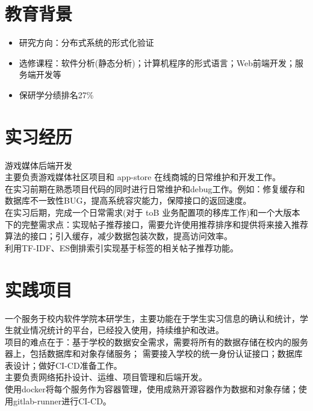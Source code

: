 \documentclass{resume}
\begin{document}

\sepspace
{}

\section{教育背景}
\begin{itemize}
    \item 研究方向：分布式系统的形式化验证
\end{itemize}
\begin{itemize}
    \item 选修课程：软件分析(静态分析)；计算机程序的形式语言；Web前端开发；服务端开发等
    \item 保研学分绩排名27\%
\end{itemize}
\sepspace

\section{实习经历}
\Content
{{游戏媒体后端开发}}
{
    {\\主要负责游戏媒体社区项目和 app-store 在线商城的日常维护和开发工作。}
    {\\在实习前期在熟悉项目代码的同时进行日常维护和debug工作。例如：修复缓存和数据库不一致性BUG，提高系统容灾能力，保障接口的返回速度。}
    {\\在实习后期，完成一个日常需求(对于 toB 业务配置项的移库工作)和一个大版本下的完整需求点：实现帖子推荐接口，需要允许使用推荐排序和提供将来接入推荐算法的接口；引入缓存，减少数据包装次数，提高访问效率。}
    {\\利用TF-IDF、ES倒排索引实现基于标签的相关帖子推荐功能。}
}
\sepspace

\section{实践项目}
\Contents
{一个服务于校内软件学院本研学生，主要功能在于学生实习信息的确认和统计，学生就业情况统计的平台，已经投入使用，持续维护和改进。}
{\\
项目的难点在于：基于学校的数据安全需求，需要将所有的数据存储在校内的服务器上，包括数据库和对象存储服务；
需要接入学校的统一身份认证接口；数据库表设计；做好CI-CD准备工作。
\\主要负责网络拓扑设计、运维、项目管理和后端开发。\\使用docker将每个服务作为容器管理，使用成熟开源容器作为数据和对象存储；使用gitlab-runner进行CI-CD。 }
\end{document}
